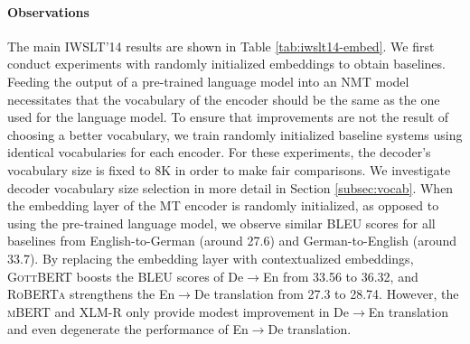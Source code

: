 \documentclass[11pt]{article}
\begin{document}
\paragraph{Observations} 
The main IWSLT'14 results are shown in Table \ref{tab:iwslt14-embed}. We first conduct experiments with randomly initialized embeddings to obtain baselines. Feeding the output of a pre-trained language model into an NMT model necessitates that the vocabulary of the encoder should be the same as the one used for the language model. To ensure that improvements are not the result of choosing a better vocabulary, we train randomly initialized baseline systems using identical vocabularies for each encoder. For these experiments, the decoder's vocabulary size is fixed to 8K in order to make fair comparisons. We investigate decoder vocabulary size selection in more detail in Section \ref{subsec:vocab}. When the embedding layer of the MT encoder is randomly initialized, as opposed to using the pre-trained language model, we observe similar BLEU scores for all baselines from English-to-German (around 27.6) and German-to-English (around 33.7). By replacing the embedding layer with contextualized embeddings, \textsc{GottBERT} boosts the BLEU scores of De$\rightarrow$En from 33.56 to 36.32, and \textsc{RoBERTa} strengthens the En$\rightarrow$De translation from 27.3 to 28.74. However, the \textsc{mBERT} and \textsc{XLM-R} only provide modest improvement in De$\rightarrow$En translation and even degenerate the performance of En$\rightarrow$De translation.
\end{document}

